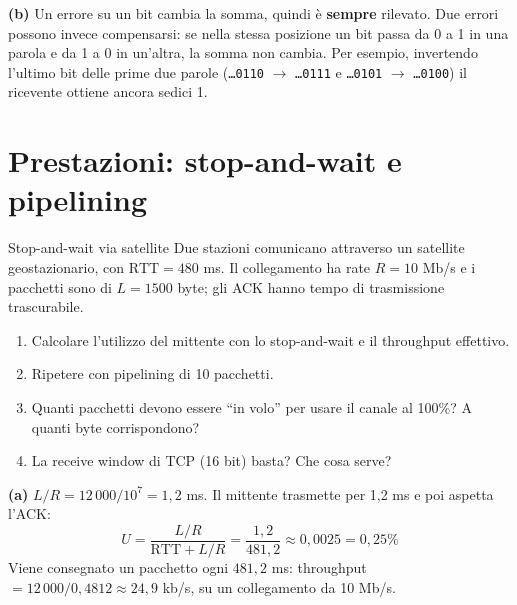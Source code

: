 \textbf{(b)} Un errore su un bit cambia la somma, quindi è \textbf{sempre} rilevato. Due errori possono invece compensarsi: se
nella stessa posizione un bit passa da 0 a 1 in una parola e da 1 a 0 in un'altra, la somma non cambia. Per esempio, invertendo
l'ultimo bit delle prime due parole (\texttt{\dots0110} $\rightarrow$ \texttt{\dots0111} e \texttt{\dots0101} $\rightarrow$
\texttt{\dots0100}) il ricevente ottiene ancora sedici 1.


\section{Prestazioni: stop-and-wait e pipelining}

\begin{esercizio}{Stop-and-wait via satellite}
Due stazioni comunicano attraverso un satellite geostazionario, con $\text{RTT} = 480$ ms. Il collegamento ha rate $R = 10$ Mb/s e
i pacchetti sono di $L = 1500$ byte; gli ACK hanno tempo di trasmissione trascurabile.
\begin{enumerate}[label=(\alph*)]
    \item Calcolare l'utilizzo del mittente con lo stop-and-wait e il throughput effettivo.
    \item Ripetere con pipelining di 10 pacchetti.
    \item Quanti pacchetti devono essere ``in volo'' per usare il canale al 100\%? A quanti byte corrispondono?
    \item La receive window di TCP (16 bit) basta? Che cosa serve?
\end{enumerate}
\end{esercizio}

\svolgimento
\textbf{(a)} $L/R = 12\,000 / 10^7 = 1{,}2$ ms. Il mittente trasmette per 1,2 ms e poi aspetta l'ACK:
$$U = \frac{L/R}{\text{RTT} + L/R} = \frac{1{,}2}{481{,}2} \approx 0{,}0025 = 0{,}25\%$$
Viene consegnato un pacchetto ogni $481{,}2$ ms: throughput $= 12\,000 / 0{,}4812 \approx 24{,}9$ kb/s, su un collegamento da
10 Mb/s.

